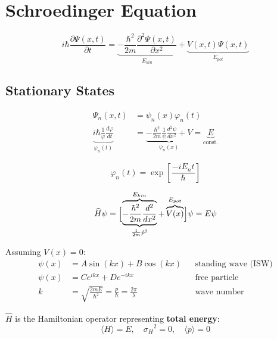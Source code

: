 \section{Schroedinger Equation}
\noindent\begin{equation*}
    i\hbar \frac{\partial \Psi(x,t)}{\partial t}           = \underbrace{- \frac{\hbar^2}{2m} \frac{\partial^2 \Psi(x,t)}{\partial x^2}}_{E_{kin}} + \underbrace{V(x,t)\Psi(x,t)}_{E_{pot}}
\end{equation*}

\subsection{Stationary States}
\noindent\begin{align*}
    \Psi_n(x,t)                                                        & = \psi_n(x)\varphi_n(t)                                                                                         \\
    \underbrace{i\hbar\frac1\varphi\frac{d\varphi}{dt}}_{\varphi_n(t)} & =\underbrace{-\frac{\hbar^2}{2m}\frac1\psi\frac{d^2\psi}{dx^2}+V}_{\psi_n (x)} = \underbrace{E}_{\text{const.}}
\end{align*}

\noindent\begin{equation*}
    \varphi_n(t) =\exp\left[\frac{-iE_n t}{\hbar}\right]
\end{equation*}

\noindent\begin{equation*}
    \widehat{H}\psi  = \Bigl[\overbrace{\underbrace{-\frac{\hbar^2}{2m}\frac{d^2}{dx^2}}_{\frac{1}{2m}\hat{p}^2}}^{E_{kin}}+ \overbrace{V(x)}^{E_{pot}}\Bigr]\psi = E\psi
\end{equation*}

Assuming $V(x) = 0$:
\noindent\begin{align*}
    \psi(x) & =A\sin(kx)+B\cos(kx)                                               &  & \text{standing wave (ISW)} \\
    \psi(x) & =Ce^{ikx}+De^{-ikx}                                                &  & \text{free particle}       \\
    k       & =\sqrt{\frac{2mE}{\hbar^{2}}}=\frac{p}{\hbar}=\frac{2\pi}{\lambda} &  & \text{wave number}
\end{align*}


$\widehat{H}$ is the Hamiltonian operator representing \textbf{total energy}:
\noindent\begin{equation*}
    \langle H\rangle = E,\quad{\sigma_H}^2 = 0, \quad \langle p\rangle = 0
\end{equation*}

